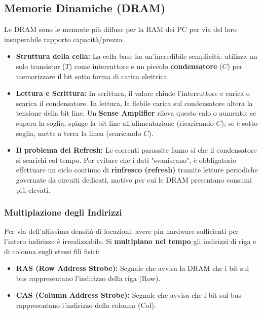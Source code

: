 \documentclass[12pt, a4paper]{article}
\begin{document}
\subsection{Memorie Dinamiche (DRAM)}
Le DRAM sono le memorie più diffuse per la RAM dei PC per via del loro insuperabile rapporto capacità/prezzo.
\begin{itemize}
    \item \textbf{Struttura della cella:} La cella base ha un'incredibile semplicità: utilizza un solo transistor ($T$) come interruttore e un piccolo \textbf{condensatore} ($C$) per memorizzare il bit sotto forma di carica elettrica. 
    \item \textbf{Lettura e Scrittura:} In scrittura, il valore chiude l'interruttore e carica o scarica il condensatore. In lettura, la flebile carica sul condensatore altera la tensione della bit line. Un \textbf{Sense Amplifier} rileva questo calo o aumento: se supera la soglia, spinge la bit line all'alimentazione (ricaricando $C$); se è sotto soglia, mette a terra la linea (scaricando $C$).
    \item \textbf{Il problema del Refresh:} Le correnti parassite fanno sì che il condensatore si scarichi col tempo. Per evitare che i dati "svaniscano", è obbligatorio effettuare un ciclo continuo di \textbf{rinfresco (refresh)} tramite letture periodiche governate da circuiti dedicati, motivo per cui le DRAM presentano consumi più elevati.
\end{itemize}

\subsubsection{Multiplazione degli Indirizzi}
Per via dell'altissima densità di locazioni, avere pin hardware sufficienti per l'intero indirizzo è irrealizzabile. Si \textbf{multiplano nel tempo} gli indirizzi di riga e di colonna sugli stessi fili fisici:
\begin{itemize}
    \item \textbf{RAS (Row Address Strobe):} Segnale che avvisa la DRAM che i bit sul bus rappresentano l'indirizzo della riga (Row).
    \item \textbf{CAS (Column Address Strobe):} Segnale che avvisa che i bit sul bus rappresentano l'indirizzo della colonna (Col).
\end{itemize}
\end{document}
